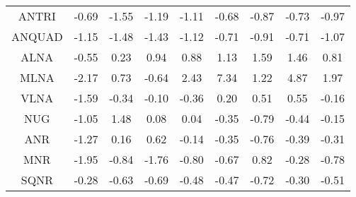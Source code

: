 \documentclass[11pt,a4paper]{report}
\begin{document}
\begin{centering}
\begin{longtable}{ | c || c | c | c | c | c | c | c || c |}
ANTRI &  \cellcolor[HTML]{FFEFEF} -0.69 &  \cellcolor[HTML]{FFD7D7} -1.55 &  \cellcolor[HTML]{FFDFDF} -1.19 &  \cellcolor[HTML]{FFE7E7} -1.11 &  \cellcolor[HTML]{FFEFEF} -0.68 &  \cellcolor[HTML]{FFE7E7} -0.87 &  \cellcolor[HTML]{FFEFEF} -0.73 &  \cellcolor[HTML]{FFE7E7} -0.97 \\
ANQUAD &  \cellcolor[HTML]{FFDFDF} -1.15 &  \cellcolor[HTML]{FFD7D7} -1.48 &  \cellcolor[HTML]{FFD7D7} -1.43 &  \cellcolor[HTML]{FFDFDF} -1.12 &  \cellcolor[HTML]{FFEFEF} -0.71 &  \cellcolor[HTML]{FFE7E7} -0.91 &  \cellcolor[HTML]{FFEFEF} -0.71 &  \cellcolor[HTML]{FFE7E7} -1.07 \\
ALNA &  \cellcolor[HTML]{FFEFEF} -0.55 &  \cellcolor[HTML]{F7F7FF} 0.23 &  \cellcolor[HTML]{E7E7FF} 0.94 &  \cellcolor[HTML]{E7E7FF} 0.88 &  \cellcolor[HTML]{DFDFFF} 1.13 &  \cellcolor[HTML]{D7D7FF} 1.59 &  \cellcolor[HTML]{D7D7FF} 1.46 &  \cellcolor[HTML]{E7E7FF} 0.81 \\
MLNA &  \cellcolor[HTML]{FFC7C7} -2.17 &  \cellcolor[HTML]{EFEFFF} 0.73 &  \cellcolor[HTML]{FFEFEF} -0.64 &  \cellcolor[HTML]{BFBFFF} 2.43 &  \cellcolor[HTML]{4848FF} 7.34 &  \cellcolor[HTML]{DFDFFF} 1.22 &  \cellcolor[HTML]{8787FF} 4.87 &  \cellcolor[HTML]{CFCFFF} 1.97 \\
VLNA &  \cellcolor[HTML]{FFD7D7} -1.59 &  \cellcolor[HTML]{FFF7F7} -0.34 &  \cellcolor[HTML]{FFFFFF} -0.10 &  \cellcolor[HTML]{FFF7F7} -0.36 &  \cellcolor[HTML]{F7F7FF} 0.20 &  \cellcolor[HTML]{EFEFFF} 0.51 &  \cellcolor[HTML]{EFEFFF} 0.55 &  \cellcolor[HTML]{FFF7F7} -0.16 \\
NUG &  \cellcolor[HTML]{FFE7E7} -1.05 &  \cellcolor[HTML]{D7D7FF} 1.48 &  \cellcolor[HTML]{FFFFFF} 0.08 &  \cellcolor[HTML]{FFFFFF} 0.04 &  \cellcolor[HTML]{FFF7F7} -0.35 &  \cellcolor[HTML]{FFEFEF} -0.79 &  \cellcolor[HTML]{FFF7F7} -0.44 &  \cellcolor[HTML]{FFFFFF} -0.15 \\
ANR &  \cellcolor[HTML]{FFDFDF} -1.27 &  \cellcolor[HTML]{FFFFFF} 0.16 &  \cellcolor[HTML]{EFEFFF} 0.62 &  \cellcolor[HTML]{FFFFFF} -0.14 &  \cellcolor[HTML]{FFF7F7} -0.35 &  \cellcolor[HTML]{FFEFEF} -0.76 &  \cellcolor[HTML]{FFF7F7} -0.39 &  \cellcolor[HTML]{FFF7F7} -0.31 \\
MNR &  \cellcolor[HTML]{FFCFCF} -1.95 &  \cellcolor[HTML]{FFE7E7} -0.84 &  \cellcolor[HTML]{FFCFCF} -1.76 &  \cellcolor[HTML]{FFE7E7} -0.80 &  \cellcolor[HTML]{FFEFEF} -0.67 &  \cellcolor[HTML]{E7E7FF} 0.82 &  \cellcolor[HTML]{FFF7F7} -0.28 &  \cellcolor[HTML]{FFEFEF} -0.78 \\
SQNR &  \cellcolor[HTML]{FFF7F7} -0.28 &  \cellcolor[HTML]{FFEFEF} -0.63 &  \cellcolor[HTML]{FFEFEF} -0.69 &  \cellcolor[HTML]{FFEFEF} -0.48 &  \cellcolor[HTML]{FFF7F7} -0.47 &  \cellcolor[HTML]{FFEFEF} -0.72 &  \cellcolor[HTML]{FFF7F7} -0.30 &  \cellcolor[HTML]{FFEFEF} -0.51 \\

\end{longtable}
\end{centering}
\end{document}
